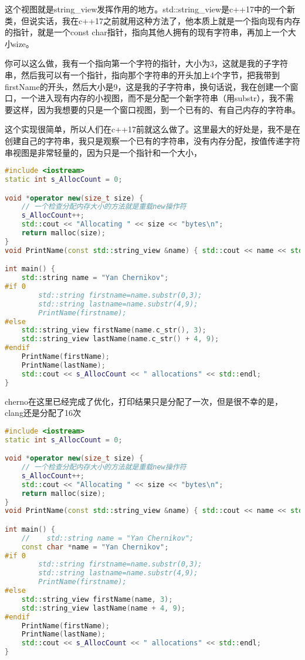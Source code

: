 这个视图就是{\ncodestyle string_view}发挥作用的地方。{\ncodestyle std::string_view}是c++17中的一个新类，但说实话，我在c++17之前就用这种方法了，他本质上就是一个指向现有内存的指针，就是一个{\ncodestyle const char}指针，指向其他人拥有的现有字符串，再加上一个大小{\ncodestyle size}。

你可以这么做，我有一个指向第一个字符的指针，大小为3，这就是我的子字符串，然后我可以有一个指针，指向那个字符串的开头加上4个字节，把我带到{\ncodestyle firstName}的开头，然后大小是9，这是我的子字符串，换句话说，我在创建一个窗口，一个进入现有内存的小视图，而不是分配一个新字符串（用{\ncodestyle substr}），我不需要这样，因为我想要的只是一个窗口视图，到一个已有的、有自己内存的字符串。

这个实现很简单，所以人们在c++17前就这么做了。这里最大的好处是，我不是在创建自己的字符串，我只是观察一个已有的字符串，没有内存分配，按值传递字符串视图是非常轻量的，因为只是一个指针和一个大小，

\begin{lstlisting}[language=c++]
#include <iostream>
static int s_AllocCount = 0;

void *operator new(size_t size) {
    // 一个检查分配内存大小的方法就是重载new操作符
    s_AllocCount++;
    std::cout << "Allocating " << size << "bytes\n";
    return malloc(size);
}
void PrintName(const std::string_view &name) { std::cout << name << std::endl; }

int main() {
    std::string name = "Yan Chernikov";
#if 0
        std::string firstname=name.substr(0,3);
        std::string lastname=name.substr(4,9);
        PrintName(firstname);
#else
    std::string_view firstName(name.c_str(), 3);
    std::string_view lastName(name.c_str() + 4, 9);
#endif
    PrintName(firstName);
    PrintName(lastName);
    std::cout << s_AllocCount << " allocations" << std::endl;
}
\end{lstlisting}


cherno在这里已经完成了优化，打印结果只是分配了一次，但是很不幸的是，clang还是分配了16次

\begin{lstlisting}[language=c++]
#include <iostream>
static int s_AllocCount = 0;

void *operator new(size_t size) {
    // 一个检查分配内存大小的方法就是重载new操作符
    s_AllocCount++;
    std::cout << "Allocating " << size << "bytes\n";
    return malloc(size);
}
void PrintName(const std::string_view &name) { std::cout << name << std::endl; }

int main() {
    //    std::string name = "Yan Chernikov";
    const char *name = "Yan Chernikov";
#if 0
        std::string firstname=name.substr(0,3);
        std::string lastname=name.substr(4,9);
        PrintName(firstname);
#else
    std::string_view firstName(name, 3);
    std::string_view lastName(name + 4, 9);
#endif
    PrintName(firstName);
    PrintName(lastName);
    std::cout << s_AllocCount << " allocations" << std::endl;
}
\end{lstlisting}


